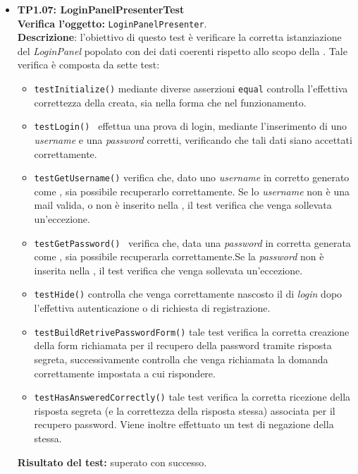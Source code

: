 \begin{itemize}
\item \textbf{TP1.07: LoginPanelPresenterTest}\\
\textbf{Verifica l'oggetto:} \texttt{LoginPanelPresenter}.\\
\textbf{Descrizione}: l'obiettivo di questo test è verificare la corretta istanziazione del \textit{LoginPanel} popolato con dei dati coerenti rispetto allo scopo della .
Tale verifica è composta da sette test:
\begin{itemize} 
\item \texttt{testInitialize()} mediante diverse asserzioni \texttt{equal} controlla l'effettiva correttezza della  creata, sia nella forma che nel funzionamento.
\item \texttt{testLogin() } effettua una prova di login, mediante l'inserimento di uno \textit{username} e una \textit{password} corretti, verificando che tali dati siano accettati correttamente.
\item \texttt{testGetUsername()} verifica che, dato uno \textit{username} in  corretto generato come , sia possibile recuperarlo correttamente. Se lo \textit{username} non è una mail valida, o non è inserito nella , il test verifica che venga sollevata un'eccezione.
\item \texttt{testGetPassword() } verifica che, data una \textit{password} in  corretta generata come , sia possibile recuperarla correttamente.Se la \textit{password} non è inserita nella , il test verifica che venga sollevata un'eccezione.
\item \texttt{testHide()} controlla che venga correttamente nascosto il  di \textit{login} dopo l'effettiva autenticazione o di richiesta di registrazione.
\item \texttt{testBuildRetrivePasswordForm()} tale test verifica la corretta creazione della form richiamata per il recupero della password tramite risposta segreta, successivamente controlla che venga richiamata la domanda correttamente impostata a cui rispondere.
\item \texttt{testHasAnsweredCorrectly()} tale test verifica la corretta ricezione della risposta segreta (e la correttezza della risposta stessa) associata per il recupero password. Viene inoltre effettuato un test di negazione della stessa.
\end{itemize}
\textbf{Risultato del test:} superato con successo.


\end{itemize}
